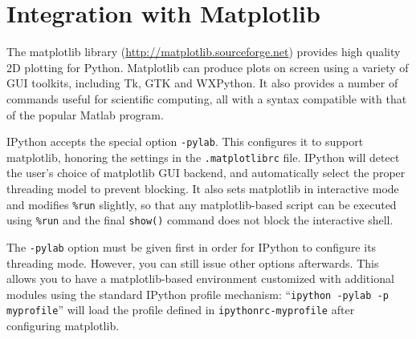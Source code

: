 


\section[Matplotlib]{\label{sec:ipython_pylab}Integration with Matplotlib}

The matplotlib library (\url{http://matplotlib.sourceforge.net})
provides high quality 2D plotting for Python. Matplotlib can produce
plots on screen using a variety of GUI toolkits, including Tk, GTK
and WXPython. It also provides a number of commands useful for scientific
computing, all with a syntax compatible with that of the popular Matlab
program.

IPython accepts the special option \texttt{-pylab}. This configures
it to support matplotlib, honoring the settings in the \texttt{.matplotlibrc}
file. IPython will detect the user's choice of matplotlib GUI backend,
and automatically select the proper threading model to prevent blocking.
It also sets matplotlib in interactive mode and modifies \texttt{\%run}
slightly, so that any matplotlib-based script can be executed using
\texttt{\%run} and the final \texttt{show()} command does not block
the interactive shell.

The \texttt{-pylab} option must be given first in order for IPython
to configure its threading mode. However, you can still issue other
options afterwards. This allows you to have a matplotlib-based environment
customized with additional modules using the standard IPython profile
mechanism: ``\texttt{ipython -pylab -p myprofile}'' will load the
profile defined in \texttt{ipythonrc-myprofile} after configuring
matplotlib.
